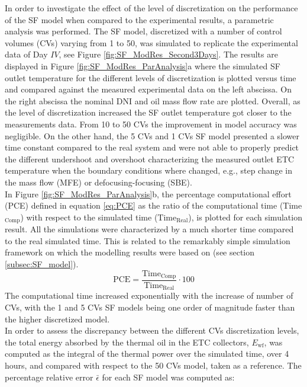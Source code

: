 \documentclass[final,3p,times,review]{elsarticle}
\begin{document}
In order to investigate the effect of the level of discretization on the performance of the SF model when compared to the experimental results, a parametric analysis was performed. The SF model, discretized with a number of control volumes (CVs) varying from 1 to 50,  was simulated to replicate the  experimental data of Day $IV$, see Figure \ref{fig:SF_ModRes_Second3Days}. The results are displayed in Figure \ref{fig:SF_ModRes_ParAnalysis}a where the simulated SF outlet temperature for the different levels of discretization is plotted versus time and compared against the measured experimental data on the left abscissa. On the right abscissa the nominal DNI and oil mass flow rate are plotted. Overall, as the level of discretization increased the SF outlet temperature got closer to the measurements data. From 10 to 50 CVs the improvement in model accuracy was negligible. On the other hand, the 5 CVs and 1 CVs SF model presented a slower time constant compared to the real system and were not able to properly predict the different undershoot and overshoot characterizing the measured outlet ETC temperature when the boundary conditions where changed, e.g., step change in the mass flow (MFE) or defocusing-focusing (SBE).\\
In Figure \ref{fig:SF_ModRes_ParAnalysis}b, the percentage computational effort (PCE) defined in equation \ref{eq:PCE} as the ratio of the computational time (Time$_\mathrm{Comp}$) with respect to the simulated time ($\mathrm{Time}_\mathrm{Real}$), is plotted for each simulation result. All the simulations were characterized by a much shorter time compared to the real simulated time. This is related to the remarkably simple simulation framework on which the modelling results were based on (see section \ref{subsec:SF_model}). 
%
\begin{equation}
\mathrm{PCE} = \frac{\mathrm{Time}_\mathrm{Comp}}{\mathrm{Time}_\mathrm{Real}} \cdot 100
\label{eq:PCE}
\end{equation}
%
The computational time increased exponentially with the increase of number of CVs, with the 1 and 5 CVs SF models being one order of magnitude faster than the higher discretized model.\\
In order to assess the discrepancy between the different CVs discretization levels, the total energy absorbed by the thermal oil in the ETC collectors, $E_\mathrm{wf}$,  was computed as the integral of the thermal power over the simulated time, over 4 hours, and compared with respect to the 50 CVs model, taken as a reference. The percentage relative error $\bar{\epsilon}$ for each SF model was computed as:
\end{document}
